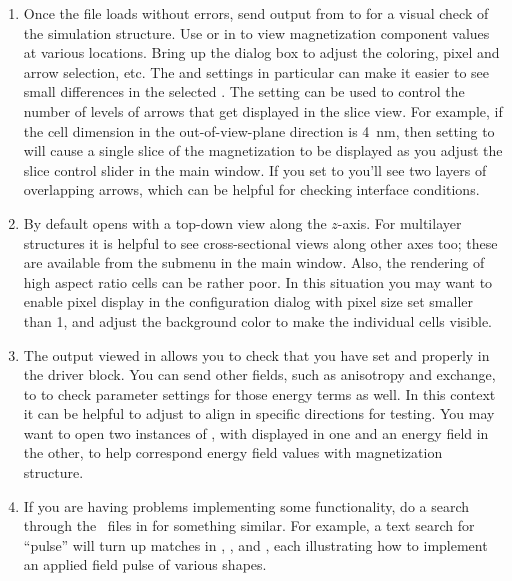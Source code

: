 \begin{enumerate}
  \item Once the file loads without errors, send 
    output from  to  for a visual check of the
    simulation structure. Use  or  in  to view magnetization component
    values at various locations. Bring up the  dialog box to adjust the coloring, pixel and
    arrow selection, etc. The  and 
    settings in particular can make it easier to see small differences
    in the selected . The  setting can
    be used to control the number of levels of arrows that get displayed
    in the slice view. For example, if the cell dimension in the
    out-of-view-plane direction is 4~nm, then setting  to
     will cause a single slice of the magnetization to be
    displayed as you adjust the slice control slider in the main
     window. If you set  to  you'll
    see two layers of overlapping arrows, which can be helpful for
    checking interface conditions.

  \item By default  opens with a top-down view along the
    $z$-axis. For multilayer structures it is helpful to see
    cross-sectional views along other axes too; these are available from
    the  submenu in the main  window.
    Also, the  rendering of high aspect ratio cells can be
    rather poor. In this situation you may want to enable pixel display
    in the  configuration dialog with pixel size set smaller
    than 1, and adjust the background color to make the individual cells
    visible.

  \item The  output viewed in  allows you
    to check that you have set  and  properly in the
    driver  block. You can send other fields, such as
    anisotropy and exchange, to  to check parameter settings
    for those energy terms as well. In this context it can be helpful to
    adjust  to align in specific directions for testing. You may
    want to open two instances of , with 
    displayed in one and an energy field in the other, to help
    correspond energy field values with magnetization structure.

  \item If you are having problems implementing some functionality, do a
    search through the \MIF\ files in  for
    something similar. For example, a text search for ``pulse'' will
    turn up matches in , , and
    , each illustrating how to implement an applied field
    pulse of various shapes.

\end{enumerate}


